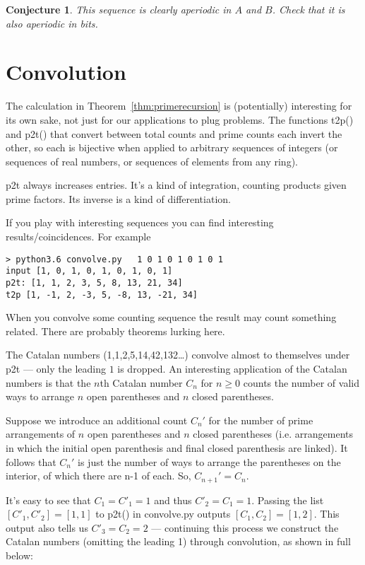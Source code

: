\documentclass[10pt]{article}
\newtheorem{conjecture}[theorem]{Conjecture}
\numberwithin{equation}{section}
\begin{document}
\begin{conjecture}
This sequence is clearly aperiodic in $A$ and $B$. Check that it is also aperiodic in bits.
\end{conjecture}
\section{Convolution}\label{sec:convolution}


The calculation in Theorem~\ref{thm:primerecursion} is (potentially) interesting for its own sake, not just for our applications to plug problems. The functions t2p() and p2t() that convert between total counts and prime counts each invert the other, so each is bijective when applied to arbitrary sequences of integers (or sequences of real numbers, or sequences of elements from any ring).

p2t always increases entries. It's a kind of integration, counting products given prime factors. Its inverse is a kind of differentiation. 

If you play with interesting sequences you can find interesting results/coincidences. For example

\begin{verbatim}
> python3.6 convolve.py   1 0 1 0 1 0 1 0 1
input [1, 0, 1, 0, 1, 0, 1, 0, 1]
p2t: [1, 1, 2, 3, 5, 8, 13, 21, 34]
t2p [1, -1, 2, -3, 5, -8, 13, -21, 34]
\end{verbatim}

When you convolve some counting sequence the result may count something related. There are probably theorems lurking here.

The Catalan numbers (1,1,2,5,14,42,132\ldots) convolve almost to themselves under p2t --- only the leading $1$ is dropped. An interesting application of the Catalan numbers is that the $n$th Catalan number $C_n$ for $n\geq 0$ counts the number of valid ways to arrange $n$ open parentheses and $n$ closed parentheses.

Suppose we introduce an additional count $C_n'$ for the number of prime arrangements of $n$ open parentheses and $n$ closed parentheses (i.e. arrangements in which the initial open parenthesis and final closed parenthesis are linked). It follows that $C_n'$ is just the number of ways to arrange the parentheses on the interior, of which there are n-1 of each. So, $C_{n+1}'=C_n$.

It's easy to see that $C_1=C'_1=1$ and thus $C'_2=C_1=1.$ Passing the list $[C'_1, C'_2]=[1,1]$ to p2t() in convolve.py outputs $[C_1, C_2]=[1,2]$. This output also tells us $C'_3=C_2=2$ — continuing this process we construct the Catalan numbers (omitting the leading 1) through convolution, as shown in full below:
\end{document}
